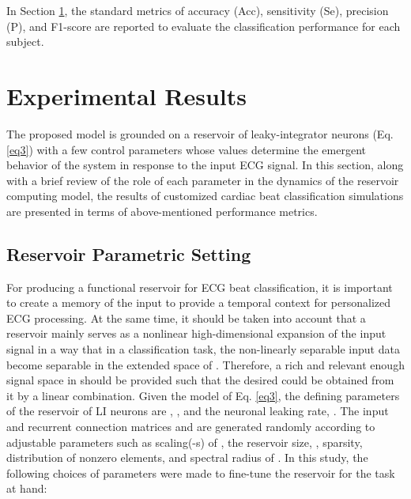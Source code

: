 \documentclass[review]{elsarticle}
\begin{document}
In Section \ref{Results}, the standard metrics of accuracy (Acc), sensitivity (Se), precision (P), and F1-score are reported to evaluate the classification performance for each subject.

\section{Experimental Results}\label{Results}

The proposed model is grounded on a reservoir of leaky-integrator neurons (Eq. \ref{eq3}) with a few control parameters whose values determine the emergent behavior of the system in response to the input ECG signal. In this section, along with a brief review of the role of each
parameter in the dynamics of the reservoir computing model, the results of customized cardiac beat classification simulations are presented in terms of above-mentioned performance metrics. 

\subsection{Reservoir Parametric Setting}
For producing a functional reservoir for ECG beat classification, it is important to create a memory of the input to provide a temporal context for personalized ECG processing. At the same time, it should be taken into account that a reservoir mainly serves as a nonlinear high-dimensional expansion  of the input signal  in a way that in a classification task, the non-linearly separable input data become separable in the extended space of . Therefore, a rich and relevant enough signal space in  should be provided such that the desired  could be obtained from it by a linear combination.
Given the model of Eq. \ref{eq3}, the defining parameters of the reservoir of LI neurons are , , and the neuronal leaking rate, . The input and recurrent connection matrices  and  are generated randomly according to adjustable parameters such as scaling(-s) of , the reservoir size, , sparsity, distribution of nonzero elements, and spectral radius of . In this study, the following choices of parameters were made to fine-tune the reservoir for the task at hand:
\end{document}
